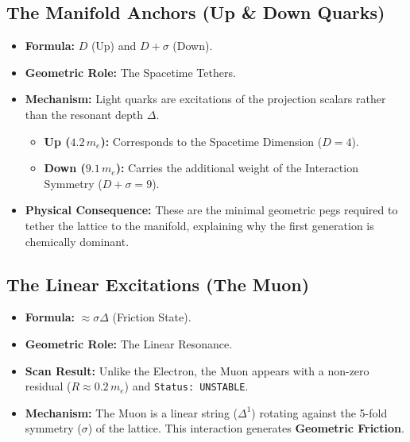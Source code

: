 \subsection*{The Manifold Anchors (Up \& Down Quarks)}
\begin{itemize}
    \item \textbf{Formula:} $D$ (Up) and $D+\sigma$ (Down).
    \item \textbf{Geometric Role:} The Spacetime Tethers.
    \item \textbf{Mechanism:} Light quarks are excitations of the projection scalars rather than the resonant depth $\Delta$.
    \begin{itemize}
        \item \textbf{Up ($4.2 \, m_e$):} Corresponds to the Spacetime Dimension ($D=4$).
        \item \textbf{Down ($9.1 \, m_e$):} Carries the additional weight of the Interaction Symmetry ($D+\sigma = 9$).
    \end{itemize}
    \item \textbf{Physical Consequence:} These are the minimal geometric pegs required to tether the lattice to the manifold, explaining why the first generation is chemically dominant.
\end{itemize}

\subsection*{The Linear Excitations (The Muon)}
\begin{itemize}
    \item \textbf{Formula:} $\approx \sigma \Delta$ (Friction State).
    \item \textbf{Geometric Role:} The Linear Resonance.
    \item \textbf{Scan Result:} Unlike the Electron, the Muon appears with a non-zero residual ($R \approx 0.2 \, m_e$) and \texttt{Status: UNSTABLE}.
    \item \textbf{Mechanism:} The Muon is a linear string ($\Delta^1$) rotating against the 5-fold symmetry ($\sigma$) of the lattice. This interaction generates \textbf{Geometric Friction}.
\end{itemize}

